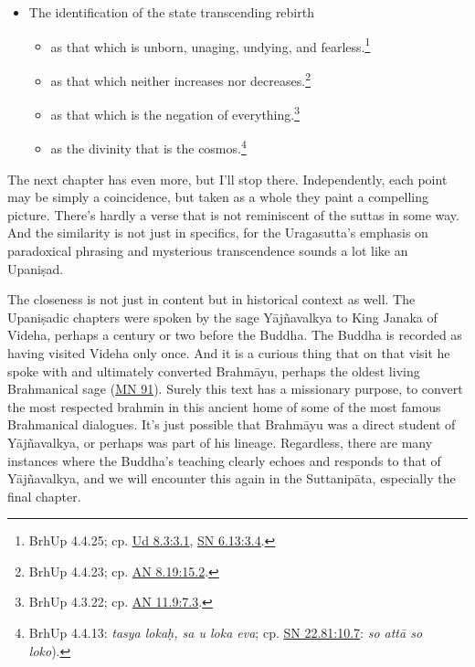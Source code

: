 \documentclass[12pt,openany]{book}%
\begin{document}
\begin{itemize}
\item The identification of the state transcending rebirth
\begin{itemize}%
\item as that which is unborn, unaging, undying, and fearless.\footnote{BrhUp 4.4.25; cp. \href{https://suttacentral.net/ud8.3/en/sujato\#3.1}{Ud 8.3:3.1}, \href{https://suttacentral.net/sn6.13/en/sujato\#3.4}{SN 6.13:3.4}. }%
\item as that which neither increases nor decreases.\footnote{BrhUp 4.4.23; cp. \href{https://suttacentral.net/an8.19/en/sujato\#15.2}{AN 8.19:15.2}. }%
\item as that which is the negation of everything.\footnote{BrhUp 4.3.22; cp. \href{https://suttacentral.net/an11.9/en/sujato\#7.3}{AN 11.9:7.3}. }%
\item as the divinity that is the cosmos.\footnote{BrhUp 4.4.13: \textit{tasya lokaḥ, sa u loka eva}; cp. \href{https://suttacentral.net/sn22.81/en/sujato\#10.7}{SN 22.81:10.7}: \textit{so \textsanskrit{attā} so loko}). }%
\end{itemize}

%
\end{itemize}

The next chapter has even more, but I’ll stop there. Independently, each point may be simply a coincidence, but taken as a whole they paint a compelling picture. There’s hardly a verse that is not reminiscent of the suttas in some way. And the similarity is not just in specifics, for the Uragasutta’s emphasis on paradoxical phrasing and mysterious transcendence sounds a lot like an \textsanskrit{Upaniṣad}.

The closeness is not just in content but in historical context as well. The \textsanskrit{Upaniṣadic} chapters were spoken by the sage \textsanskrit{Yājñavalkya} to King Janaka of Videha, perhaps a century or two before the Buddha. The Buddha is recorded as having visited Videha only once. And it is a curious thing that on that visit he spoke with and ultimately converted \textsanskrit{Brahmāyu}, perhaps the oldest living Brahmanical sage (\href{https://suttacentral.net/mn91/en/sujato}{MN 91}). Surely this text has a missionary purpose, to convert the most respected brahmin in this ancient home of some of the most famous Brahmanical dialogues. It’s just possible that \textsanskrit{Brahmāyu} was a direct student of \textsanskrit{Yājñavalkya}, or perhaps was part of his lineage. Regardless, there are many instances where the Buddha’s teaching clearly echoes and responds to that of \textsanskrit{Yājñavalkya}, and we will encounter this again in the \textsanskrit{Suttanipāta}, especially the final chapter.
\end{document}
